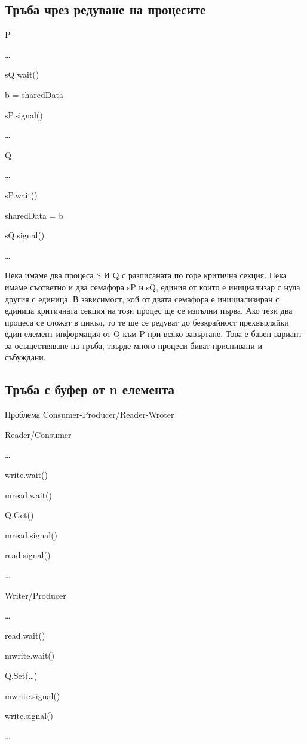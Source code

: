 \documentclass[fleqn,12pt]{article}
\begin{document}
\subsection{Тръба чрез редуване на процесите}
\begin{multicols}{2}
    P

    \dots

    sQ.wait()
    
    b = sharedData
    
    sP.signal()
    
    \dots

\columnbreak
    Q
    
    \dots
    
    sP.wait()
    
    sharedData = b
    
    sQ.signal()
    
    \dots

\end{multicols}

Нека имаме два процеса S И Q с разписаната по горе критична секция. Нека имаме съответно и два семафора sP и sQ, единия от които е инициализар с нула другия с единица. В зависимост, кой от двата семафора е инициализиран с единица критичната секция на този процес ще се изпълни първа. Ако тези два процеса се сложат в цикъл, то те ще се редуват до безкрайност прехвърляйки един елемент информация от Q към P при всяко завъртане. Това е бавен вариант за осъществяване на тръба, твърде много процеси биват приспивани и събуждани.


\subsection{Тръба с буфер от n елемента}
    Проблема Consumer-Producer/Reader-Wroter 

    \begin{multicols}{2}
        Reader/Consumer
    
        \dots
    
        write.wait()

        mread.wait()
        
        Q.Get()

        mread.signal()
        
        read.signal()

        \dots
    
    \columnbreak
        Writer/Producer
        
        \dots
        
        read.wait()

        mwrite.wait()
        
        Q.Set(\dots)

        mwrite.signal()
        
        write.signal()

        \dots
    
    \end{multicols}
\end{document}
